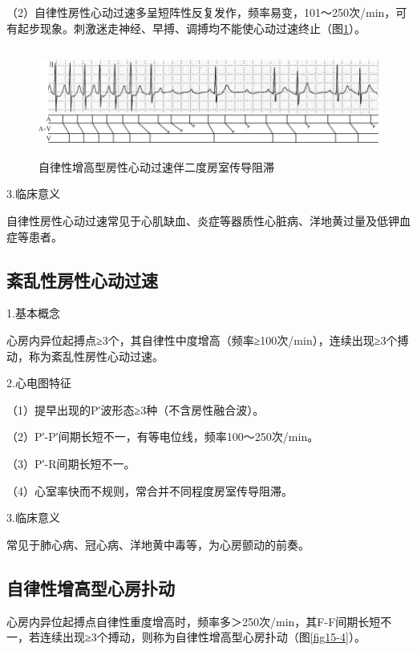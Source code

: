 （2）自律性房性心动过速多呈短阵性反复发作，频率易变，101～250次/min，可有起步现象。刺激迷走神经、早搏、调搏均不能使心动过速终止（图\ref{fig15-3}）。

\begin{figure}[!htbp]
 \centering
 \includegraphics[width=5.76042in,height=1.40625in]{./images/Image00269.jpg}
 \captionsetup{justification=centering}
 \caption{自律性增高型房性心动过速伴二度房室传导阻滞}
 \label{fig15-3}
  \end{figure} 

3.临床意义

自律性房性心动过速常见于心肌缺血、炎症等器质性心脏病、洋地黄过量及低钾血症等患者。

\protect\hypertarget{text00022.htmlux5cux23subid265}{}{}

\subsection{紊乱性房性心动过速}

1.基本概念

心房内异位起搏点≥3个，其自律性中度增高（频率≥100次/min），连续出现≥3个搏动，称为紊乱性房性心动过速。

2.心电图特征

（1）提早出现的P′波形态≥3种（不含房性融合波）。

（2）P′-P′间期长短不一，有等电位线，频率100～250次/min。

（3）P′-R间期长短不一。

（4）心室率快而不规则，常合并不同程度房室传导阻滞。

3.临床意义

常见于肺心病、冠心病、洋地黄中毒等，为心房颤动的前奏。

\protect\hypertarget{text00022.htmlux5cux23subid266}{}{}

\subsection{自律性增高型心房扑动}

心房内异位起搏点自律性重度增高时，频率多＞250次/min，其F-F间期长短不一，若连续出现≥3个搏动，则称为自律性增高型心房扑动（图\ref{fig15-4}）。

